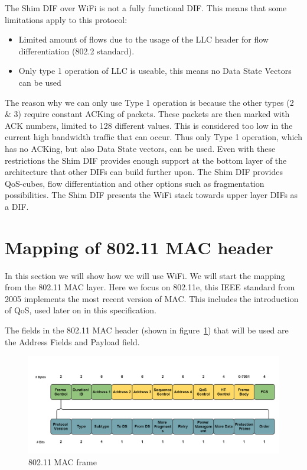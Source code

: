 \npar

The Shim DIF over WiFi is not a fully functional DIF. This means that some limitations apply to this protocol:

\begin{itemize}
	\item Limited amount of flows due to the usage of the LLC header for flow differentiation (802.2 standard\citep{ieee8022std}).
	\item Only type 1 operation of LLC is useable, this means no Data State Vectors can be used
\end{itemize}

The reason why we can only use Type 1 operation is because the other types (2 \& 3) require constant ACKing of packets. These packets are then marked with ACK numbers, limited to 128 different values. This is considered too low in the current high bandwidth traffic that can occur. Thus only Type 1 operation, which has no ACKing, but also Data State vectors, can be used. Even with these restrictions the Shim DIF provides enough support at the bottom layer of the architecture that other DIFs can build further upon. The Shim DIF provides QoS-cubes, flow differentiation and other options such as fragmentation possibilities. The Shim DIF presents the WiFi stack towards upper layer DIFs as a DIF.

\section{Mapping of 802.11 MAC header}

In this section we will show how we will use WiFi. We will start the mapping from the 802.11 MAC layer. Here we focus on 802.11e, this IEEE standard from 2005 implements the most recent version of MAC. This includes the introduction of QoS, used later on in this specification. 

\npar

The fields in the 802.11 MAC header (shown in figure~\ref{fig:80211macframe}) that will be used are the Address Fields and Payload field.

\begin{figure}[H]
    \centering
    \includegraphics[width=1\textwidth]{figures/80211macframe}
    \caption{802.11 MAC frame} 
    \label{fig:80211macframe}
\end{figure}

